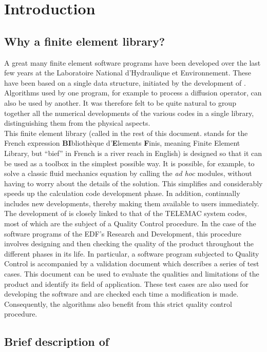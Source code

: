 %
%
\chapter{Introduction}
%
%
%
\section{Why a finite element library?}
%
A great many finite element software programs have been developed over the last
few years at the Laboratoire National d'Hydraulique et Environnement. These
have been based on a single data structure, initiated by the development of
. Algorithms used by one program, for example to process a diffusion
operator, can also be used by another. It was therefore felt to be quite
natural to group together all the numerical developments of the various codes
in a single library, distinguishing them from the physical aspects.
\\
This finite element library (called \bief in the rest of this document. \bief
stands for the French expression \textbf{BI}blioth\`{e}que d'\textbf{E}lements
\textbf{F}inis, meaning Finite Element Library, but ``bief'' in French is a
river reach in English) is designed so that it can be used as a toolbox in the
simplest possible way. It is possible, for example, to solve a classic fluid
mechanics equation by calling the \bief \textit{ad hoc} modules, without having
to worry about the details of the solution. This simplifies and considerably
speeds up the calculation code development phase. In addition, \bief continually
includes new developments, thereby making them available to users immediately.
\\
The development of \bief is closely linked to that of the TELEMAC system codes,
most of which are the subject of a Quality Control procedure. In the case of
the software programs of the EDF's Research and Development, this procedure
involves designing and then checking the quality of the product throughout the
different phases in its life. In particular, a software program subjected to
Quality Control is accompanied by a validation document which describes a
series of test cases. This document can be used to evaluate the qualities and
limitations of the product and identify its field of application. These test
cases are also used for developing the software and are checked each time a
modification is made. Consequently, the \bief algorithms also benefit from this
strict quality control procedure.
%
\section{Brief description of \bief}

